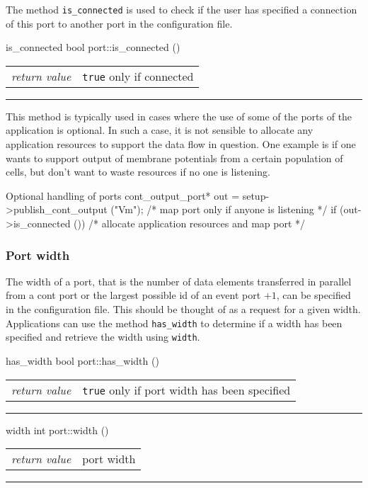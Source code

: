 \documentclass[a4paper]{report}
\makeatletter
\newenvironment{parameters}%
{\begin{tabular}{@{\hspace{2em}}lp{0.6\textwidth}}}%
{\end{tabular}\par\vspace{1mm}\par\hrule\par\vspace{5mm}}
\makeatother
\begin{document}
The method \lstinline|is_connected| is used to check if the user has
specified a connection of this port to another port in the
configuration file.

\begin{head}{is_connected}
  bool port::is_connected ()
\end{head}
\begin{parameters}
  \emph{return value} & \lstinline|true| only if connected\\
\end{parameters}

This method is typically used in cases where the use of some of the
ports of the application is optional.  In such a case, it is not
sensible to allocate any application resources to support the data
flow in question.  One example is if one wants to support output of
membrane potentials from a certain population of cells, but don't want
to waste resources if no one is listening.

\pagebreak
\begin{code}{Optional handling of ports}
cont_output_port* out =
   setup->publish_cont_output ("Vm");
/* map port only if anyone is listening */
if (out->is_connected ())
  /* allocate application resources and map port */
\end{code}

\subsubsection{Port width}
\label{sec:width}

The width of a port, that is the number of data
elements transferred in parallel from a cont port or the largest
possible id of an event port $+ 1$, can be specified in the
configuration file. This should be thought of as a request for a given
width.  Applications can use the method \lstinline|has_width| to
determine if a width has been specified and retrieve the width using
\lstinline|width|.

\begin{head}{has_width}
  bool port::has_width ()
\end{head}
\begin{parameters}
  \emph{return value} & \lstinline|true| only if port width has been
                         specified \\
\end{parameters}

\begin{head}{width}
  int port::width ()
\end{head}
\begin{parameters}
  \emph{return value} & port width \\
\end{parameters}
\end{document}
